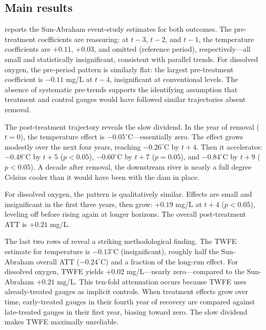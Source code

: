 \documentclass[12pt]{article}
\begin{document}
\subsection{Main results}

 reports the Sun-Abraham event-study estimates for both outcomes. The pre-treatment coefficients are reassuring: at $t - 3$, $t - 2$, and $t - 1$, the temperature coefficients are $+0.11$, $+0.03$, and omitted (reference period), respectively---all small and statistically insignificant, consistent with parallel trends. For dissolved oxygen, the pre-period pattern is similarly flat: the largest pre-treatment coefficient is $-0.11$ mg/L at $t - 4$, insignificant at conventional levels. The absence of systematic pre-trends supports the identifying assumption that treatment and control gauges would have followed similar trajectories absent removal.

The post-treatment trajectory reveals the slow dividend. In the year of removal ($t = 0$), the temperature effect is $-0.05^{\circ}$C---essentially zero. The effect grows modestly over the next four years, reaching $-0.26^{\circ}$C by $t + 4$. Then it accelerates: $-0.48^{\circ}$C by $t + 5$ ($p < 0.05$), $-0.60^{\circ}$C by $t + 7$ ($p = 0.05$), and $-0.84^{\circ}$C by $t + 9$ ($p < 0.05$). A decade after removal, the downstream river is nearly a full degree Celsius cooler than it would have been with the dam in place.

For dissolved oxygen, the pattern is qualitatively similar. Effects are small and insignificant in the first three years, then grow: $+0.19$ mg/L at $t + 4$ ($p < 0.05$), leveling off before rising again at longer horizons. The overall post-treatment ATT is $+0.21$ mg/L.

The last two rows of  reveal a striking methodological finding. The TWFE estimate for temperature is $-0.13^{\circ}$C (insignificant), roughly half the Sun-Abraham overall ATT ($-0.24^{\circ}$C) and a fraction of the long-run effect. For dissolved oxygen, TWFE yields $+0.02$ mg/L---nearly zero---compared to the Sun-Abraham $+0.21$ mg/L. This ten-fold attenuation occurs because TWFE uses already-treated gauges as implicit controls. When treatment effects grow over time, early-treated gauges in their fourth year of recovery are compared against late-treated gauges in their first year, biasing toward zero. The slow dividend makes TWFE maximally unreliable.


\end{document}
